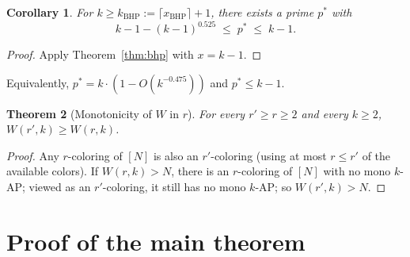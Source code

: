 \documentclass[11pt,reqno,a4paper]{amsart}
\theoremstyle{plain}
\newtheorem{theorem}{Theorem}[section]
\newtheorem{corollary}[theorem]{Corollary}
\theoremstyle{definition}
\theoremstyle{remark}
\numberwithin{equation}{section}
\begin{document}
\begin{corollary}
\label{cor:bhp}
For $k\ge k_{\mathrm{BHP}}:=\lceil x_{\mathrm{BHP}}\rceil+1$, there
exists a prime $p^{*}$ with
\[
k-1-(k-1)^{0.525}\;\le\;p^{*}\;\le\;k-1.
\]
\end{corollary}

\begin{proof}
Apply Theorem~\ref{thm:bhp} with $x=k-1$.
\end{proof}

\noindent Equivalently, $p^{*}=k\cdot(1-O(k^{-0.475}))$ and
$p^{*}\le k-1$.

\begin{theorem}[Monotonicity of $W$ in $r$]
\label{thm:monotone}
For every $r'\ge r\ge 2$ and every $k\ge 2$, $W(r',k)\ge W(r,k)$.
\end{theorem}

\begin{proof}
Any $r$-coloring of $[N]$ is also an $r'$-coloring (using at most
$r\le r'$ of the available colors). If $W(r,k)>N$, there is an
$r$-coloring of $[N]$ with no mono $k$-AP; viewed as an
$r'$-coloring, it still has no mono $k$-AP; so $W(r',k)>N$.
\end{proof}

\section{Proof of the main theorem}
\label{sec:proof}
\end{document}
